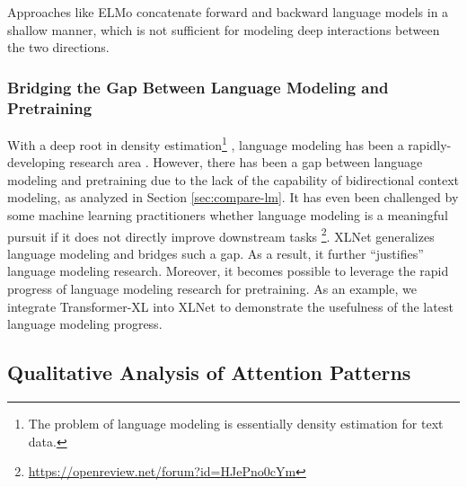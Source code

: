 \documentclass{article}
\begin{document}
Approaches like ELMo \cite{peters2018deep} concatenate forward and backward language models in a shallow manner, which is not sufficient for modeling deep interactions between the two directions.

\subsubsection{Bridging the Gap Between Language Modeling and Pretraining}

With a deep root in density estimation\footnote{The problem of language modeling is essentially density estimation for text data.} \cite{bengio2000modeling,uria2016neural,oord2016pixel}, language modeling has been a rapidly-developing research area \cite{dai2019transformer,al2018character,baevski2018adaptive}. However, there has been a gap between language modeling and pretraining due to the lack of the capability of bidirectional context modeling, as analyzed in Section \ref{sec:compare-lm}. It has even been challenged by some machine learning practitioners whether language modeling is a meaningful pursuit if it does not directly improve downstream tasks \footnote{\url{https://openreview.net/forum?id=HJePno0cYm}}. XLNet generalizes language modeling and bridges such a gap. As a result, it further ``justifies'' language modeling research. Moreover, it becomes possible to leverage the rapid progress of language modeling research for pretraining. As an example, we integrate Transformer-XL into XLNet to demonstrate the usefulness of the latest language modeling progress.

\subsection{Qualitative Analysis of Attention Patterns} \label{sec:qual}
\end{document}
